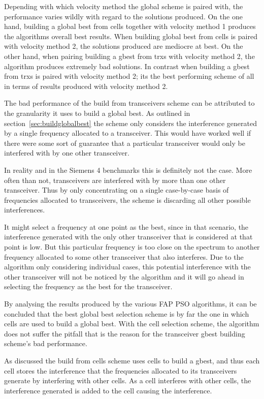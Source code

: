 Depending with which velocity method the global scheme is paired with, the performance varies wildly with regard to the solutions produced. On the one hand, building a global best from cells together with velocity method 1 produces the algorithms overall best results. When building global best from cells is paired with velocity method 2, the solutions produced are mediocre at best. On the other hand, when pairing building a gbest from trxs with velocity method 2, the algorithm produces extremely bad solutions. In contrast when building a gbest from trxs is paired with velocity method 2; its the best performing scheme of all in terms of results produced with velocity method 2.

The bad performance of the build from transceivers scheme can be attributed to the granularity it uses to build a global best. As outlined in section~\ref{sec:buildglobalbest} the scheme only considers the interference generated by a single frequency allocated to a transceiver. This would have worked well if there were some sort of guarantee that a particular transceiver would only be interfered with by one other transceiver.

In reality and in the Siemens 4 benchmarks this is definitely not the case. More often than not, transceivers are interfered with by more than one other transceiver. Thus by only concentrating on a single case-by-case basis of frequencies allocated to transceivers, the scheme is discarding all other possible interferences. 

It might select a frequency at one point as the best, since in that scenario, the interference generated with the only other transceiver that is considered at that point is low. But this particular frequency is too close on the spectrum to another frequency allocated to some other transceiver that also interferes. Due to the algorithm only considering individual cases, this potential interference with the other transceiver will not be noticed by the algorithm and it will go ahead in selecting the frequency as the best for the transceiver.

By analysing the results produced by the various FAP PSO algorithms, it can be concluded that the best global best selection scheme is by far the one in which cells are used to build a global best. With the cell selection scheme, the algorithm does not suffer the pitfall that is the reason for the transceiver gbest building scheme's bad performance.

As discussed the build from cells scheme uses cells to build a gbest, and thus each cell stores the interference that the frequencies allocated to its transceivers generate by interfering with other cells. As a cell interferes with other cells, the interference generated is added to the cell causing the interference.

